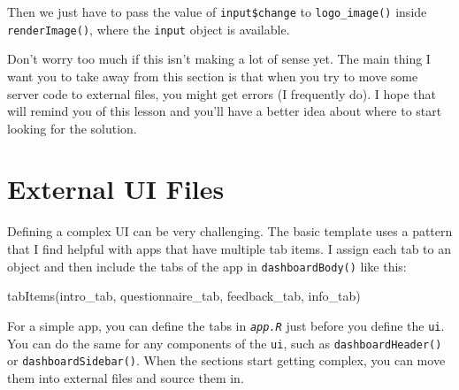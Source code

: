 \documentclass[
  oneside]{book}
\newenvironment{Shaded}{\begin{snugshade}}{\end{snugshade}}
\newcommand{\AttributeTok}[1]{\textcolor[rgb]{0.77,0.63,0.00}{#1}}
\newcommand{\ConstantTok}[1]{\textcolor[rgb]{0.00,0.00,0.00}{#1}}
\newcommand{\ControlFlowTok}[1]{\textcolor[rgb]{0.13,0.29,0.53}{\textbf{#1}}}
\newcommand{\FunctionTok}[1]{\textcolor[rgb]{0.00,0.00,0.00}{#1}}
\newcommand{\NormalTok}[1]{#1}
\newcommand{\OtherTok}[1]{\textcolor[rgb]{0.56,0.35,0.01}{#1}}
\newcommand{\SpecialCharTok}[1]{\textcolor[rgb]{0.00,0.00,0.00}{#1}}
\begin{document}
Then we just have to pass the value of \texttt{input\$change} to \texttt{logo\_image}\texttt{()} inside \texttt{renderImage}\texttt{()}, where the \texttt{input} object is available.

\begin{Shaded}
\end{Shaded}

Don't worry too much if this isn't making a lot of sense yet. The main thing I want you to take away from this section is that when you try to move some server code to external files, you might get errors (I frequently do). I hope that will remind you of this lesson and you'll have a better idea about where to start looking for the solution.

\hypertarget{external-ui-files}{%
\section{External UI Files}\label{external-ui-files}}

Defining a complex UI can be very challenging. The basic template uses a pattern that I find helpful with apps that have multiple tab items. I assign each tab to an object and then include the tabs of the app in \texttt{dashboardBody}\texttt{()} like this:

\begin{Shaded}
\begin{Highlighting}[]
\FunctionTok{tabItems}\NormalTok{(intro\_tab, questionnaire\_tab, feedback\_tab, info\_tab)}
\end{Highlighting}
\end{Shaded}

For a simple app, you can define the tabs in \textit{\texttt{app.R}} just before you define the \texttt{ui}. You can do the same for any components of the \texttt{ui}, such as \texttt{dashboardHeader}\texttt{()} or \texttt{dashboardSidebar}\texttt{()}. When the sections start getting complex, you can move them into external files and source them in.
\end{document}
